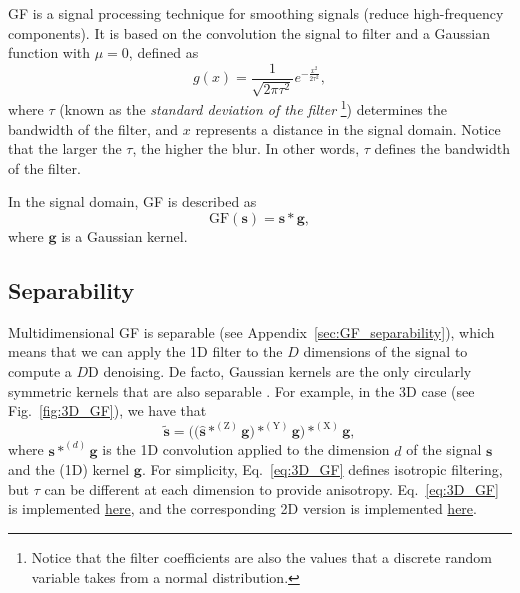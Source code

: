 \chapter{}

\gls{GF} is a signal processing technique for smoothing signals
(reduce high-frequency components). It is based on the convolution the
signal to filter and a Gaussian function with $\mu=0$, defined as
\begin{equation}
  g(x) = \frac{1}{\sqrt{2\pi\tau^2}}e^{-\frac{{x}^2}{2\tau^2}},
  \label{eq:GK}
\end{equation}
where $\tau$ (known as the \emph{standard deviation of the filter}
\footnote{Notice that the filter coefficients are also the values that
  a discrete random variable takes from a normal distribution.})
determines the bandwidth of the filter, and $x$ represents a distance
in the signal domain. Notice that the larger the $\tau$, the higher
the blur. In other words, $\tau$ defines the bandwidth of the filter.

In the signal domain, \gls{GF} is described as
\begin{equation}
  \text{GF}(\mathbf{s}) = \mathbf{s}\ast\mathbf{g},
\end{equation}
where $\mathbf{g}$ is a Gaussian kernel.

\section{Separability}
Multidimensional \gls{GF} is separable (see
Appendix~\ref{sec:GF_separability}), which means that we can apply the
1D filter to the $D$ dimensions of the signal to compute a $D$D
denoising. De facto, Gaussian kernels are the only circularly
symmetric kernels that are also separable
\cite{gonzalez1992digital}. For example, in the 3D case (see
Fig.~\ref{fig:3D_GF}), we have that
\begin{equation}
  \tilde{\mathbf{s}} = \Big(\big(\hat{\mathbf s}*^{(\text{Z})}{\mathbf g}\big)*^{(\text{Y})}{\mathbf g}\Big)*^{(\text{X})}{\mathbf g},
    \label{eq:3D_GF}
\end{equation}
where ${\mathbf s}*^{(d)}{\mathbf g}$ is the 1D convolution applied to
the dimension $d$ of the signal ${\mathbf s}$ and the (1D) kernel
${\mathbf g}$. For simplicity, Eq.~\ref{eq:3D_GF} defines isotropic
filtering, but $\tau$ can be different at each dimension to provide
anisotropy. Eq.~\ref{eq:3D_GF} is implemented
\href{https://github.com/vicente-gonzalez-ruiz/denoising/blob/main/src/denoising/volume/gaussian.py}{here},
and the corresponding 2D version is implemented
\href{https://github.com/vicente-gonzalez-ruiz/denoising/blob/main/src/denoising/image/gaussian.py}{here}.

